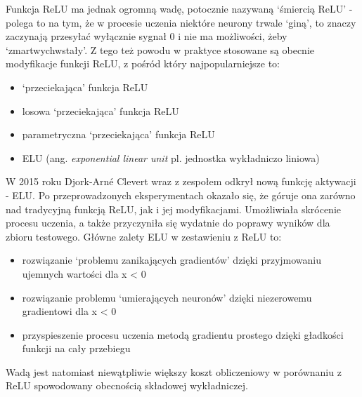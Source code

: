 \documentclass[a4paper,11pt]{article}
\begin{document}
    \bigskip

    Funkcja ReLU ma jednak ogromną wadę, potocznie nazywaną `śmiercią ReLU' - polega to na tym, że w procesie uczenia niektóre neurony trwale `giną', to znaczy zaczynają przesyłać wyłącznie sygnał 0 i nie ma możliwości, żeby `zmartwychwstały'\cite{UczenieMaszynowe2018}. Z tego też powodu w praktyce stosowane są obecnie modyfikacje funkcji ReLU, z pośród który najpopularniejsze to:
    \begin{itemize}
        \item `przeciekająca' funkcja ReLU
        \item losowa `przeciekająca' funkcja ReLU
        \item parametryczna `przeciekająca' funkcja ReLU
        \item ELU (ang. \textit{exponential linear unit} pl. jednostka wykładniczo liniowa)
    \end{itemize}

    \bigskip

    W 2015 roku Djork-Arné Clevert wraz z zespołem odkrył nową funkcję aktywacji - ELU\cite{FastAndAccurateDeepNetworkLearningByELU2016}. Po przeprowadzonych eksperymentach okazało się, że góruje ona zarówno nad tradycyjną funkcją ReLU, jak i jej modyfikacjami. Umożliwiała skrócenie procesu uczenia, a także przyczyniła się wydatnie do poprawy wyników dla zbioru testowego\cite{UczenieMaszynowe2018}. Główne zalety ELU w zestawieniu z ReLU to:
    \begin{itemize}
        \item rozwiązanie `problemu zanikających gradientów' dzięki przyjmowaniu ujemnych wartości dla x < 0
        \item rozwiązanie problemu `umierających neuronów' dzięki niezerowemu gradientowi dla x < 0
        \item przyspieszenie procesu uczenia metodą gradientu prostego dzięki gładkości funkcji na cały przebiegu
    \end{itemize}

    \smallskip

    Wadą jest natomiast niewątpliwie większy koszt obliczeniowy w porównaniu z ReLU spowodowany obecnością składowej wykładniczej.

    \bigskip
\end{document}
